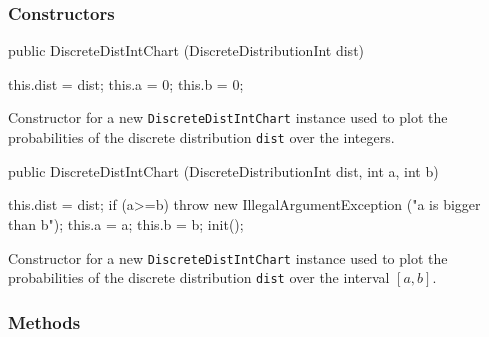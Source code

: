\subsubsection*{Constructors}
\begin{code}

   public DiscreteDistIntChart (DiscreteDistributionInt dist) \begin{hide} {
      this.dist = dist;
      this.a = 0;
      this.b = 0;
   }\end{hide}
\end{code}
\begin{tabb}
 Constructor for a new \texttt{DiscreteDistIntChart} instance used to plot the
probabilities of the
discrete distribution \texttt{dist} over the integers.
\end{tabb}
\begin{htmlonly}
\end{htmlonly}
\begin{code}

   public DiscreteDistIntChart (DiscreteDistributionInt dist, int a, int b) \begin{hide} {
      this.dist = dist;
      if (a>=b) throw new IllegalArgumentException ("a is bigger than b");
      this.a = a;
      this.b = b;
      init();
   }\end{hide}
\end{code}
\begin{tabb}
 Constructor for a new \texttt{DiscreteDistIntChart} instance used to plot the
probabilities of the
discrete distribution \texttt{dist} over the interval $[a,b]$.
\end{tabb}
\begin{htmlonly}
\end{htmlonly}

\subsubsection*{Methods}

